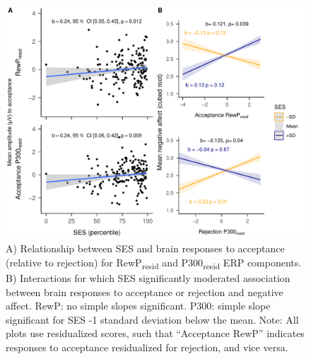 \documentclass[
  man,floatsintext]{apa7}
\begin{document}
\begin{figure}
\centering
\includegraphics{BUDS_tables_and_figures_working_alternative_electrodes_files/figure-latex/unnamed-chunk-14-1.pdf}
\caption{\label{fig:unnamed-chunk-14}A) Relationship between SES and brain responses to acceptance (relative to rejection) for RewP\textsubscript{resid} and P300\textsubscript{resid} ERP components. B) Interactions for which SES significantly moderated association between brain responses to acceptance or rejection and negative affect. RewP: no simple slopes significant. P300: simple slope significant for SES -1 standard deviation below the mean. Note: All plots use residualized scores, such that ``Acceptance RewP'' indicates responses to acceptance residualized for rejection, and vice versa.}
\end{figure}
\end{document}
